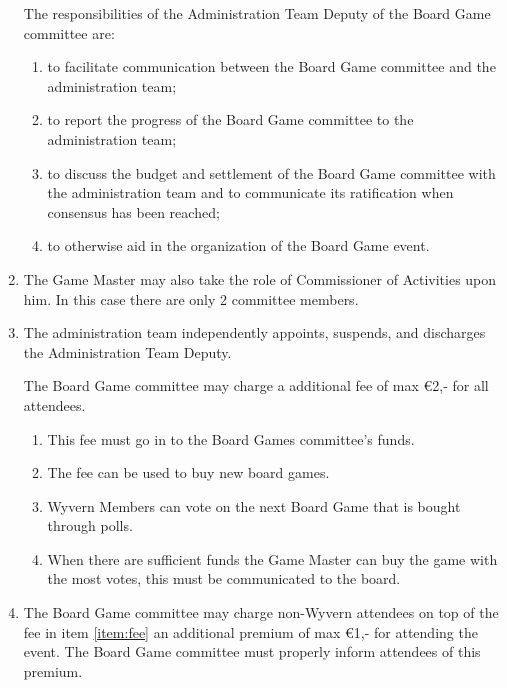 \begin{enumerate}
    \begin{item}
        The responsibilities of the Administration Team Deputy of the Board Game committee are:
        \begin{enumerate}
            \item to facilitate communication between the Board Game committee and the administration team;
            \item to report the progress of the Board Game committee to the administration team;
            \item to discuss the budget and settlement of the Board Game committee with the administration team and to communicate its ratification when consensus has been reached;
            \item to otherwise aid in the organization of the Board Game event.
        \end{enumerate}
    \end{item}

	\item The Game Master may also take the role of Commissioner of Activities upon him. In this case there are only 2 committee members.

    \item The administration team independently appoints, suspends, and discharges the Administration Team Deputy.

    \begin{item}
		\label{item:fee}The Board Game committee may charge a additional fee of max \euro2,- for all attendees.
		\begin{enumerate}
				\item This fee must go in to the Board Games committee's funds.
				\item The fee can be used to buy new board games.
				\item Wyvern Members can vote on the next Board Game that is bought through polls.
				\item When there are sufficient funds the Game Master can buy the game with the most votes, this must be communicated to the board.
		\end{enumerate}
    \end{item}

    \item The Board Game committee may charge non-Wyvern attendees on top of the fee in item \ref{item:fee} an additional premium of max \euro1,- for attending the event. The Board Game committee must properly inform attendees of this premium.


\end{enumerate}
